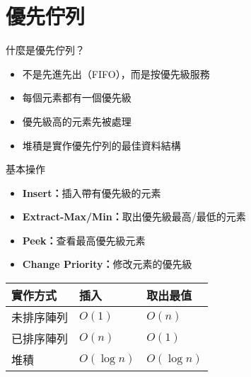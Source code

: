 \documentclass{beamer}
\begin{document}
\section{優先佇列}

\begin{frame}{什麼是優先佇列？}
\begin{itemize}
    \item 不是先進先出（FIFO），而是按優先級服務
    \item 每個元素都有一個優先級
    \item 優先級高的元素先被處理
    \item 堆積是實作優先佇列的最佳資料結構
\end{itemize}

\vspace{1em}
\begin{block}{基本操作}
\begin{itemize}
    \item \textbf{Insert：}插入帶有優先級的元素
    \item \textbf{Extract-Max/Min：}取出優先級最高/最低的元素
    \item \textbf{Peek：}查看最高優先級元素
    \item \textbf{Change Priority：}修改元素的優先級
\end{itemize}
\end{block}

\vspace{1em}
\begin{center}
\renewcommand{\arraystretch}{1.3}
\begin{tabular}{|>{\centering\arraybackslash}m{3cm}|>{\centering\arraybackslash}m{2cm}|>{\centering\arraybackslash}m{2cm}|}
\hline
\textbf{實作方式} & \textbf{插入} & \textbf{取出最值} \\
\hline
未排序陣列 & $O(1)$ & $O(n)$ \\
\hline
已排序陣列 & $O(n)$ & $O(1)$ \\
\hline
堆積 & $O(\log n)$ & $O(\log n)$ \\
\hline
\end{tabular}
\end{center}
\end{frame}
\end{document}
